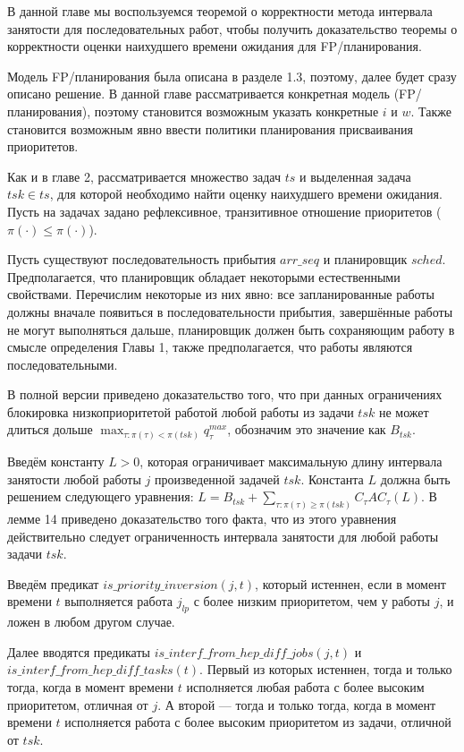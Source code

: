 \documentclass[14pt]{matmex-diploma-custom}
\begin{document}
В данной главе мы воспользуемся теоремой о корректности метода интервала занятости для 
  последовательных работ, чтобы получить доказательство теоремы о корректности 
  оценки наихудшего времени ожидания для FP\-/планирования. 

Модель FP\-/планирования была описана в разделе 1.3, поэтому, далее будет сразу описано 
  решение. В данной главе рассматривается конкретная модель (FP\-/планирования), поэтому 
  становится возможным указать конкретные $i$ и $w$. Также становится возможным явно 
  ввести политики планирования присваивания приоритетов.

Как и в главе 2, рассматривается множество задач $ts$ и выделенная задача $tsk \in ts$,
  для которой необходимо найти оценку наихудшего времени ожидания. Пусть на 
  задачах задано рефлексивное, транзитивное отношение приоритетов ($\pi(\cdot) \leq \pi(\cdot)$).

Пусть существуют последовательность прибытия $arr\_seq$ и планировщик $sched$. 
  Предполагается, что планировщик обладает некоторыми естественными свойствами. 
  Перечислим некоторые из них явно: 
    все запланированные работы должны вначале появиться в последовательности прибытия, 
    завершённые работы не могут выполняться дальше, 
    планировщик должен быть сохраняющим работу в смысле определения Главы 1,
    также предполагается, что работы являются последовательными.

В полной версии приведено доказательство того, что при данных ограничениях 
  блокировка низкоприоритетой работой любой работы 
  из задачи $tsk$ не может длиться дольше $\max_{\tau:\pi(\tau) < \pi(tsk)} q_{\tau}^{max}$, 
  обозначим это значение как $B_{tsk}$.

Введём константу $L > 0$, которая ограничивает максимальную длину интервала занятости 
  любой работы $j$ произведенной задачей $tsk$. Константа $L$ должна быть решением
  следующего уравнения: $L = B_{tsk} + \sum_{\tau: \pi(\tau) \geq \pi(tsk)} C_{\tau}AC_{\tau}(L)$.
  В лемме 14 приведено доказательство того факта, что из этого уравнения действительно следует 
  ограниченность интервала занятости для любой работы задачи $tsk$. 

Введём предикат $is\_priority\_inversion(j, t)$, который истеннен, если 
  в момент времени $t$ выполняется работа $j_{lp}$ с более низким приоритетом, чем у работы $j$, 
  и ложен в любом другом случае.

Далее вводятся предикаты $is\_interf\_from\_hep\_diff\_jobs(j,t)$ и $is\_interf\_from\_hep\_diff\_tasks(t)$.
  Первый из которых истеннен, тогда и только тогда, когда в момент времени $t$ исполняется 
  любая работа с более высоким приоритетом, отличная от $j$. А второй --- тогда и только тогда, когда 
  в момент времени $t$ исполняется работа с более высоким приоритетом из задачи, отличной от $tsk$. 
\end{document}
